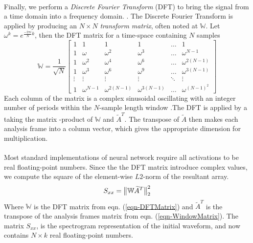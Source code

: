 \documentclass[12pt,letterpaper]{article}
\begin{document}
\paragraph*{}Finally, we perform a \textit{Discrete Fourier Transform} (DFT) to bring the signal from a time domain into a frequency domain. \cite{Olson,Peatross}. The Discrete Fourier Transform is applied by producing an $N \times N$ \textit{transform matrix}, often noted at $\mathbb{W}$. Let $\omega^k = e^{\frac{-2\pi i}{N}k}$, then the DFT matrix for a time-space containing $N$ samples
\begin{equation}
\label{eqn-DFTMatrix}
\mathbb{W} = \frac{1}{\sqrt{N}}
\begin{bmatrix}
1 & 1 & 1 & 1 & \hdots & 1 \\
1 & \omega		& \omega^2 & \omega^3 & \hdots & \omega^{N-1} \\
1 & \omega^2	& \omega^4 & \omega^6 & \hdots & \omega^{2(N-1)} \\
1 & \omega^3	& \omega^6 & \omega^9 & \hdots & \omega^{3(N-1)} \\
\vdots & \vdots & \vdots & \vdots & \ddots & \vdots \\
1 & \omega^{N-1} & \omega^{2(N-1)} & \omega^{3(N-1)} & \hdots & \omega^{(N-1)^2}
\end{bmatrix}
\end{equation}
Each column of the matrix is a complex sinusoidal oscillating with an integer number of periods within the $N$-sample length window \cite{Short,Peatross}.The DFT is applied by a taking the matrix -product of $\mathbb{W}$ and $\widetilde{A}^T$. The transpose of $\widetilde{A}$ then makes each analysis frame into a column vector, which gives the appropriate dimension for multiplication.

\paragraph*{}Most standard implementations of neural network require all activations to be real floating-point numbers. Since the the DFT matrix introduce complex values, we compute the square of the element-wise $L2$-norm of the resultant array.
\begin{equation}
\label{eqn-Spectrogram}
S_{xx} = \big{\lVert} \mathbb{W}\widetilde{A}^T \big{\rVert}_{2}^{2}
\end{equation}
Where $\mathbb{W}$ is the DFT matrix from eqn. (\ref{eqn-DFTMatrix}) and $\widetilde{A}^T$ is the transpose of the analysis frames matrix from eqn. (\ref{eqn-WindowMatrix}). The matrix $S_{xx}$, is the spectrogram representation of the initial waveform, and now contains $N \times k$ real floating-point numbers.
\end{document}
